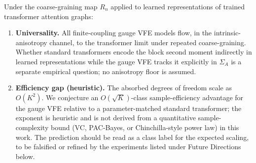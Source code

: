 \documentclass[twoside,11pt]{article}
\begin{document}
\begin{conjecture}
\label{conj:rg_universality}
Under the coarse-graining map $R_n$ applied to learned representations of trained transformer attention graphs:
\begin{enumerate}
\item[(a)] \textbf{Universality.} All finite-coupling gauge VFE models flow, in the intrinsic-anisotropy channel, to the transformer limit under repeated coarse-graining. Whether standard transformers encode the block second moment indirectly in learned representations while the gauge VFE tracks it explicitly in $\Sigma_A$ is a separate empirical question; no anisotropy floor is assumed.
\item[(b)] \textbf{Efficiency gap (heuristic).} The absorbed degrees of freedom scale as $O(K^2)$. We conjecture an $O(\sqrt{K})$-class sample-efficiency advantage for the gauge VFE relative to a parameter-matched standard transformer; the exponent is heuristic and is not derived from a quantitative sample-complexity bound (VC, PAC-Bayes, or Chinchilla-style power law) in this work. The prediction should be read as a class label for the expected scaling, to be falsified or refined by the experiments listed under Future Directions below.
\end{enumerate}
\end{conjecture}
\end{document}
